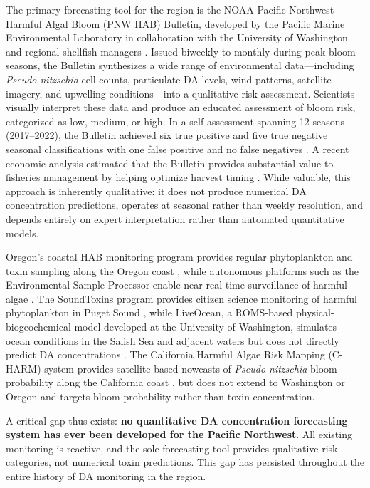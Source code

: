 \documentclass[preprint,12pt,authoryear]{elsarticle}
\begin{document}
The primary forecasting tool for the region is the NOAA Pacific Northwest Harmful Algal Bloom (PNW HAB) Bulletin, developed by the Pacific Marine Environmental Laboratory in collaboration with the University of Washington and regional shellfish managers \citep{McCabe2023}. Issued biweekly to monthly during peak bloom seasons, the Bulletin synthesizes a wide range of environmental data---including \textit{Pseudo-nitzschia} cell counts, particulate DA levels, wind patterns, satellite imagery, and upwelling conditions---into a qualitative risk assessment. Scientists visually interpret these data and produce an educated assessment of bloom risk, categorized as low, medium, or high. In a self-assessment spanning 12 seasons (2017--2022), the Bulletin achieved six true positive and five true negative seasonal classifications with one false positive and no false negatives \citep{McCabe2023}. A recent economic analysis estimated that the Bulletin provides substantial value to fisheries management by helping optimize harvest timing \citep{Jin2024}. While valuable, this approach is inherently qualitative: it does not produce numerical DA concentration predictions, operates at seasonal rather than weekly resolution, and depends entirely on expert interpretation rather than automated quantitative models.

Oregon's coastal HAB monitoring program provides regular phytoplankton and toxin sampling along the Oregon coast \citep{McKibben2015}, while autonomous platforms such as the Environmental Sample Processor enable near real-time surveillance of harmful algae \citep{Moore2021}. The SoundToxins program provides citizen science monitoring of harmful phytoplankton in Puget Sound \citep{Trainer2023}, while LiveOcean, a ROMS-based physical-biogeochemical model developed at the University of Washington, simulates ocean conditions in the Salish Sea and adjacent waters but does not directly predict DA concentrations \citep{MacCready2021}. The California Harmful Algae Risk Mapping (C-HARM) system provides satellite-based nowcasts of \textit{Pseudo-nitzschia} bloom probability along the California coast \citep{Anderson2016}, but does not extend to Washington or Oregon and targets bloom probability rather than toxin concentration.

A critical gap thus exists: \textbf{no quantitative DA concentration forecasting system has ever been developed for the Pacific Northwest}. All existing monitoring is reactive, and the sole forecasting tool provides qualitative risk categories, not numerical toxin predictions. This gap has persisted throughout the entire history of DA monitoring in the region.
\end{document}
